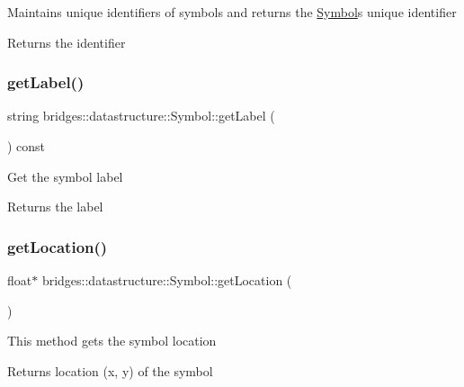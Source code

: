 Maintains unique identifiers of symbols and returns the \mbox{\hyperlink{classbridges_1_1datastructure_1_1_symbol}{Symbol}}\textquotesingle{}s unique identifier

\begin{DoxyReturn}{Returns}
the identifier 
\end{DoxyReturn}
\mbox{\label{classbridges_1_1datastructure_1_1_symbol_a549906b96da5d53b964844ca5f593b7f}} 
\subsubsection{\texorpdfstring{getLabel()}{getLabel()}}
{\footnotesize\ttfamily string bridges\+::datastructure\+::\+Symbol\+::get\+Label (\begin{DoxyParamCaption}{ }\end{DoxyParamCaption}) const\hspace{0.3cm}{\ttfamily [inline]}}

Get the symbol label

\begin{DoxyReturn}{Returns}
the label 
\end{DoxyReturn}
\mbox{\label{classbridges_1_1datastructure_1_1_symbol_aeb4ec154605998d77dd9f96aa99ff16a}} 
\subsubsection{\texorpdfstring{getLocation()}{getLocation()}}
{\footnotesize\ttfamily float$\ast$ bridges\+::datastructure\+::\+Symbol\+::get\+Location (\begin{DoxyParamCaption}{ }\end{DoxyParamCaption})\hspace{0.3cm}{\ttfamily [inline]}}

This method gets the symbol location

\begin{DoxyReturn}{Returns}
location (x, y) of the symbol 
\end{DoxyReturn}
\mbox{\label{classbridges_1_1datastructure_1_1_symbol_a9365f8d91faf67e14ceaa89f8a5d0338}} 
